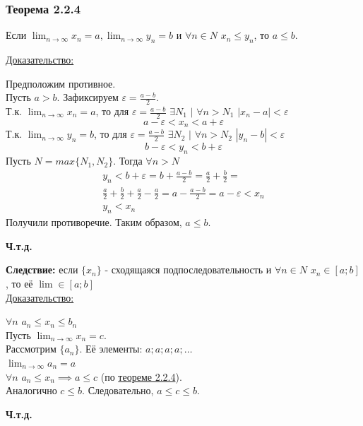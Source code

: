 \documentclass[12pt]{article}
\def\posl#1#2{\{#1_{#2}\}}
\begin{document}
    \subsubsection*{Теорема 2.2.4}\label{th:2.2.4}
    Если $\lim_{n\to\infty}x_n = a, \lim_{n\to\infty}y_n = b$ и $\forall n \in N$ $x_n \le y_n$, то $a \le b$.\par\noindent
    \underline{Доказательство:} 
    \begin{adjustwidth}{1.5em}{1.5em}
        Предположим противное.\\
        Пусть $a > b$. Зафиксируем $\varepsilon = \frac{a-b}{2}$.\\
        Т.к. $\lim_{n\to\infty} x_n = a$, то для $\varepsilon = \frac{a-b}{2}$ $\exists N_{1}$ $\big|$ $\forall n > N_{1}$ $|x_n - a| < \varepsilon$
        \[
            a - \varepsilon < x_n < a + \varepsilon
        \]
        Т.к. $\lim_{n\to\infty} y_n = b$, то для $\varepsilon = \frac{a-b}{2}$ $\exists N_{2}$ $\big|$ $\forall n > N_{2}$ $|y_n - b| < \varepsilon$
        \[
            b - \varepsilon < y_n < b + \varepsilon
        \]
        Пусть $N = max\{N_{1}, N_{2}\}$. Тогда $\forall n > N$
        \begin{gather*}
            y_n < b + \varepsilon = b + \frac{a-b}{2} = \frac{a}{2} + \frac{b}{2} =\\
            \frac{a}{2} + \frac{b}{2} + \frac{a}{2} - \frac{a}{2} = a - \frac{a-b}{2} = a - \varepsilon < x_n\\
            y_n < x_n
        \end{gather*}
        Получили противоречие. Таким образом, $a \le b$.
        \begin{center}
            \textbf{Ч.т.д.}
        \end{center}        
    \end{adjustwidth}
    
    \noindent \textbf{Следствие:} если $\posl{x}{n}$ - сходящаяся подпоследовательность и $\forall n \in N$ $x_n \in [a;b]$, то её $\lim \in [a;b]$\\
    \underline{Доказательство:} 
    \begin{adjustwidth}{1.5em}{1.5em}
        $\forall n$ $a_{n} \le x_n \le b_{n}$\\
        Пусть $\lim_{n\to\infty}x_n = c$.\\
        Рассмотрим $\posl{a}{n}$. Её элементы: $a; a; a; a; \dots$\\
        $\lim_{n\to\infty}a_{n} = a$\\
        $\forall n$ $a_{n} \le x_n \implies a \le c$ (по \hyperref[th:2.2.4]{теореме 2.2.4}).\\
        Аналогично $c \le b$. Следовательно, $a \le c \le b$.
        \begin{center}
            \textbf{Ч.т.д.}
        \end{center}
    \end{adjustwidth}
\end{document}

